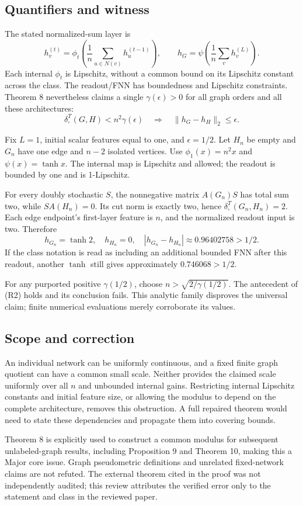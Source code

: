 \documentclass[10pt]{article}
\begin{document}
\subsection*{Quantifiers and witness}
The stated normalized-sum layer is \[h_v^{(t)}=\phi_t\!\left(\frac1n\sum_{u\in N(v)}h_u^{(t-1)}\right),
 \qquad h_G=\psi\!\left(\frac1n\sum_v h_v^{(L)}\right).\] Each internal \(\phi_t\) is Lipschitz, without a common bound on its Lipschitz constant across the class. The readout/FNN has boundedness and Lipschitz constraints. Theorem 8 nevertheless claims a single \(\gamma(\epsilon)>0\) for all graph orders and all these architectures: \[\delta_\square^T(G,H)<n^2\gamma(\epsilon)
 \quad\Longrightarrow\quad
 \|h_G-h_H\|_2\le\epsilon. \tag{R2}\]\par
Fix \(L=1\), initial scalar features equal to one, and \(\epsilon=1/2\). Let \(H_n\) be empty and \(G_n\) have one edge and \(n-2\) isolated vertices. Use \(\phi_1(x)=n^2x\) and \(\psi(x)=\tanh x\). The internal map is Lipschitz and allowed; the readout is bounded by one and is 1-Lipschitz.\par
For every doubly stochastic \(S\), the nonnegative matrix \(A(G_n)S\) has total sum two, while \(SA(H_n)=0\). Its cut norm is exactly two, hence \(\delta_\square^T(G_n,H_n)=2\). Each edge endpoint’s first-layer feature is \(n\), and the normalized readout input is two. Therefore \[h_{G_n}=\tanh2,\quad h_{H_n}=0,\quad
 |h_{G_n}-h_{H_n}|\approx0.96402758>1/2.\] If the class notation is read as including an additional bounded FNN after this readout, another \(\tanh\) still gives approximately \(0.746068>1/2\).\par
For any purported positive \(\gamma(1/2)\), choose \(n>\sqrt{2/\gamma(1/2)}\). The antecedent of (R2) holds and its conclusion fails. This analytic family disproves the universal claim; finite numerical evaluations merely corroborate its values.\par
\subsection*{Scope and correction}
An individual network can be uniformly continuous, and a fixed finite graph quotient can have a common small scale. Neither provides the claimed scale uniformly over all \(n\) and unbounded internal gains. Restricting internal Lipschitz constants and initial feature size, or allowing the modulus to depend on the complete architecture, removes this obstruction. A full repaired theorem would need to state these dependencies and propagate them into covering bounds.\par
Theorem 8 is explicitly used to construct a common modulus for subsequent unlabeled-graph results, including Proposition 9 and Theorem 10, making this a Major core issue. Graph pseudometric definitions and unrelated fixed-network claims are not refuted. The external theorem cited in the proof was not independently audited; this review attributes the verified error only to the statement and class in the reviewed paper.\par
\end{document}
